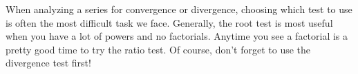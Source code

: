 \documentclass{ximera}
\begin{document}
When analyzing a series for convergence or divergence, choosing which 
test to use is often the most difficult task we face.  Generally, the root test 
is most useful when you have a lot of powers and no factorials.  Anytime 
you see a factorial is a pretty good time to try the ratio test.  Of course, 
don't forget to use the divergence test first!
\end{document}
